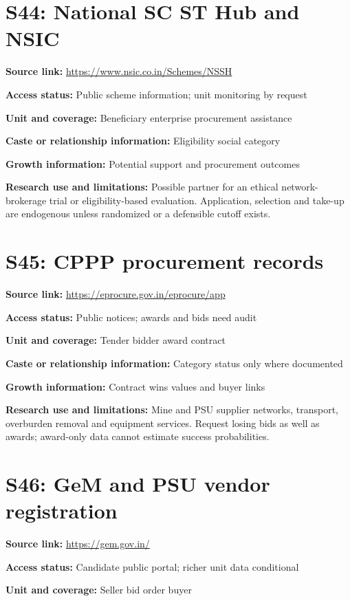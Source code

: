 \documentclass[11pt,a4paper]{report}
\begin{document}
\section{S44: National SC ST Hub and NSIC}\hypertarget{S44}{}
\textbf{Source link:} \url{https://www.nsic.co.in/Schemes/NSSH}

\textbf{Access status:} Public scheme information; unit monitoring by request

\textbf{Unit and coverage:} Beneficiary enterprise procurement assistance

\textbf{Caste or relationship information:} Eligibility social category

\textbf{Growth information:} Potential support and procurement outcomes

\textbf{Research use and limitations:} Possible partner for an ethical network-brokerage trial or eligibility-based evaluation. Application, selection and take-up are endogenous unless randomized or a defensible cutoff exists.

\section{S45: CPPP procurement records}\hypertarget{S45}{}
\textbf{Source link:} \url{https://eprocure.gov.in/eprocure/app}

\textbf{Access status:} Public notices; awards and bids need audit

\textbf{Unit and coverage:} Tender bidder award contract

\textbf{Caste or relationship information:} Category status only where documented

\textbf{Growth information:} Contract wins values and buyer links

\textbf{Research use and limitations:} Mine and PSU supplier networks, transport, overburden removal and equipment services. Request losing bids as well as awards; award-only data cannot estimate success probabilities.

\section{S46: GeM and PSU vendor registration}\hypertarget{S46}{}
\textbf{Source link:} \url{https://gem.gov.in/}

\textbf{Access status:} Candidate public portal; richer unit data conditional

\textbf{Unit and coverage:} Seller bid order buyer
\end{document}

